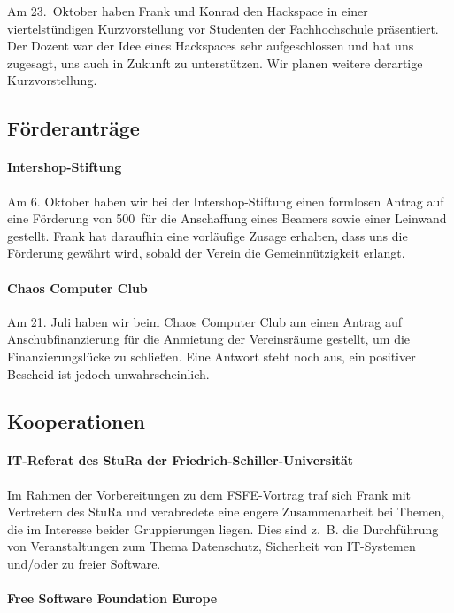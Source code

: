 \documentclass[10pt,DIV16]{scrartcl}
\begin{document}
Am 23.~Oktober haben Frank und Konrad den Hackspace in einer viertelstündigen
Kurzvorstellung vor Studenten der Fachhochschule präsentiert.  Der Dozent war
der Idee eines Hackspaces sehr aufgeschlossen und hat uns zugesagt, uns auch
in Zukunft zu unterstützen.  Wir planen weitere derartige Kurzvorstellung.

\subsection{Förderanträge}

\paragraph{Intershop-Stiftung}

Am 6. Oktober haben wir bei der Intershop-Stiftung einen formlosen 
Antrag auf eine Förderung von 500\EUR\ für die Anschaffung eines 
Beamers sowie einer Leinwand gestellt.  Frank hat daraufhin eine 
vorläufige Zusage erhalten, dass uns die Förderung gewährt wird, 
sobald der Verein die Gemeinnützigkeit erlangt.

\paragraph{Chaos Computer Club}

Am 21. Juli haben wir beim Chaos Computer Club am einen Antrag auf 
Anschubfinanzierung für die Anmietung der Vereinsräume gestellt, um 
die Finanzierungslücke zu schließen. Eine Antwort steht noch aus, 
ein positiver Bescheid ist jedoch unwahrscheinlich.


\subsection{Kooperationen}

\paragraph{IT-Referat des StuRa der Friedrich-Schiller-Universität}

Im Rahmen der Vorbereitungen zu dem FSFE-Vortrag traf sich Frank mit 
Vertretern des StuRa und verabredete eine engere Zusammenarbeit bei 
Themen, die im Interesse beider Gruppierungen liegen. Dies sind z.\,
B. die Durchführung von Veranstaltungen zum Thema Datenschutz, 
Sicherheit von IT-Systemen und/oder zu freier Software.

\paragraph{Free Software Foundation Europe}
\end{document}
